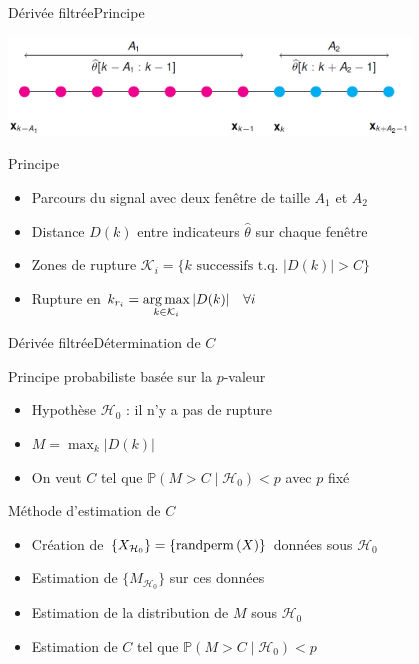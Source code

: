 \begin{frame}{Dérivée filtrée}{Principe}

\begin{center}
\includegraphics[width=0.8\textwidth]{images/deriveeFiltree}
\end{center}

\begin{block}{Principe}
\begin{itemize}
\item Parcours du signal avec deux fenêtre de taille $A_1$ et $A_2$
\item Distance $D(k)$ entre indicateurs $\hat{\theta}$ sur chaque fenêtre
\item Zones de rupture $\mathcal{K}_i = \{k \text{ successifs t.q. } |D(k)| > C\}$
\item Rupture en $k_{r_i} = \displaystyle \operatorname*{arg\,max}_{k \in \mathcal{K}_i} |D(k)| \hspace{1em}\forall i$
\end{itemize}
\end{block}


\end{frame}

\begin{frame}{Dérivée filtrée}{Détermination de $C$}

\begin{block}{Principe probabiliste basée sur la $p$-valeur}
\vspace{-.7em}
\begin{itemize}
\item Hypothèse $\mathcal{H}_0$ : il n'y a pas de rupture
\item $M = \displaystyle \max_{k} |D(k)|$
\item On veut $C$ tel que $\mathbb{P}(M>C\mid	\mathcal{H}_0) < p$ avec $p$ fixé
\end{itemize}
\end{block}

\begin{exampleblock}{Méthode d'estimation de $C$}
\vspace{-.7em}
\begin{itemize}
\item Création de $\{X_{\mathcal{H}_0}\} = \{\operatorname*{randperm}{(X)}\}$ données sous $\mathcal{H}_0$
\item Estimation de $\{M_{\mathcal{H}_0}\}$ sur ces données
\item Estimation de la distribution de $M$ sous $\mathcal{H}_0$
\item Estimation de $C$ tel que $\mathbb{P}(M>C\mid	\mathcal{H}_0) < p$
\end{itemize}
\end{exampleblock}

\end{frame}

